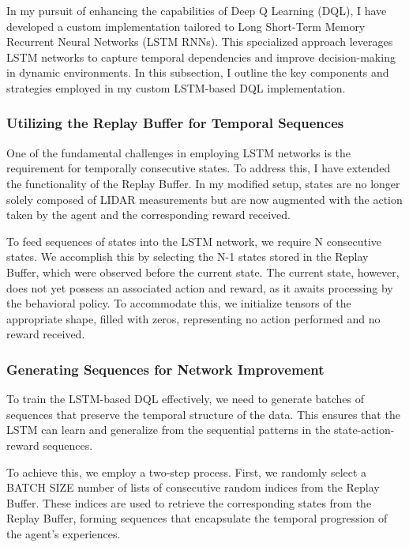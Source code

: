 \documentclass{scrartcl}
\begin{document}
In my pursuit of enhancing the capabilities of Deep Q Learning (DQL), I have developed a custom implementation tailored to 
Long Short-Term Memory Recurrent Neural Networks (LSTM RNNs). This specialized approach leverages LSTM networks to capture temporal 
dependencies and improve decision-making in dynamic environments. In this subsection, I outline the key components and strategies 
employed in my custom LSTM-based DQL implementation.

\subsubsection{Utilizing the Replay Buffer for Temporal Sequences} 

One of the fundamental challenges in employing LSTM networks is the requirement for temporally consecutive states. To address this, 
I have extended the functionality of the Replay Buffer. In my modified setup, states are no longer solely composed of LIDAR 
measurements but are now augmented with the action taken by the agent and the corresponding reward received.

To feed sequences of states into the LSTM network, we require N consecutive states. We accomplish this by selecting the N-1 states 
stored in the Replay Buffer, which were observed before the current state. The current state, however, does not yet possess an 
associated action and reward, as it awaits processing by the behavioral policy. To accommodate this, we initialize tensors of the 
appropriate shape, filled with zeros, representing no action performed and no reward received.

\subsubsection{Generating Sequences for Network Improvement}

To train the LSTM-based DQL effectively, we need to generate batches of sequences that preserve the temporal structure of the data. This ensures that the LSTM can learn and generalize from the sequential patterns in the state-action-reward sequences.

To achieve this, we employ a two-step process. First, we randomly select a BATCH SIZE number of lists of consecutive random indices from the Replay Buffer. These indices are used to retrieve the corresponding states from the Replay Buffer, forming sequences that encapsulate the temporal progression of the agent's experiences.
\end{document}
